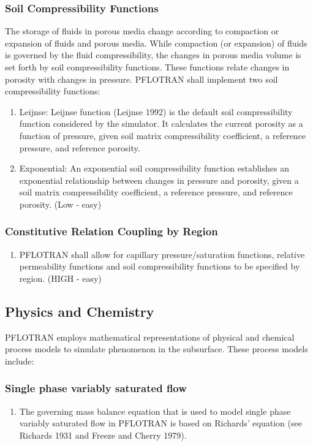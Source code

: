 \subsubsection{Soil Compressibility Functions}
The storage of fluids in porous media change according to compaction or expansion of fluids and porous media. While compaction (or expansion) of fluids is governed by the fluid compressibility, the changes in porous media volume is set forth by soil compressibility functions. These functions relate changes in porosity with changes in pressure. PFLOTRAN shall implement two soil compressibility functions:
\begin{enumerate}[label=CR \arabic*.,ref=CR \arabic*,nosep, resume]
	\item Leijnse: \label{leijnse} Leijnse function (Leijnse 1992) is the default soil compressibility function considered by the simulator. It calculates the current porosity as a function of pressure, given soil matrix compressibility coefficient, a reference pressure, and reference porosity.
	\item Exponential: \label{exponential} An exponential soil compressibility function establishes an exponential relationship between changes in pressure and porosity, given a soil matrix compressibility coefficient, a reference pressure, and reference porosity. (Low - easy)
\end{enumerate}
\subsubsection{Constitutive Relation Coupling by Region}
\begin{enumerate}[label=CR \arabic*.,ref=CR \arabic*,nosep, resume]
	\item PFLOTRAN shall allow for capillary pressure/saturation functions, relative permeability functions and soil compressibility functions to be specified by region. \label{CRbyRegion} (HIGH - easy)
\end{enumerate}

\subsection{Physics and Chemistry}
PFLOTRAN employs mathematical representations of physical and chemical process models to simulate phenomenon in the subsurface.  These process models include:
\subsubsection{Single phase variably saturated flow}
\begin{enumerate}[label=PC \arabic*.,ref=PC \arabic*,nosep]
	\item The governing mass balance equation that is used to model single phase variably saturated flow in PFLOTRAN is based on Richards’ equation (see Richards 1931 and Freeze and Cherry 1979). \label{sngVarSatFlow}
\end{enumerate}
